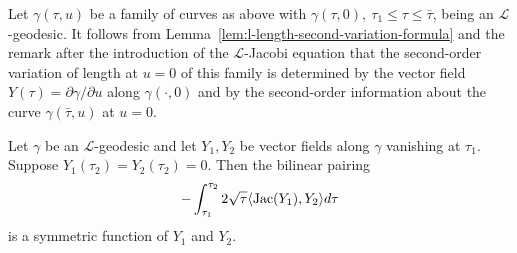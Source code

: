 \begin{remark}\label{rem:second-variation-determined-by-jacobi}
\label{variremark}

Let $\gamma(\tau,u)$ be a family of curves as above with
$\gamma(\tau,0),\ \tau_1\le \tau\le \bar \tau$, being an ${\mathcal
L}$-geodesic. It follows from Lemma~\ref{lem:l-length-second-variation-formula} and the remark
after the introduction of the ${\mathcal L}$-Jacobi equation that
the second-order variation of length at $u=0$ of this family is
determined by the vector field $Y(\tau)=\partial \gamma/\partial u$
along $\gamma(\cdot,0)$ and by the second-order information about
the curve $\gamma(\bar\tau,u)$ at $u=0$.
\end{remark}


\begin{corollary}\label{cor:l-jacobi-bilinear-symmetric}
\label{symmY}

Let $\gamma$ be an ${\mathcal L}$-geodesic and let $Y_1,Y_2$ be vector fields
along $\gamma$ vanishing at $\tau_1$. Suppose $Y_1(\tau_2)=Y_2(\tau_2)=0$.
 Then the
bilinear pairing
$$-\int_{\tau_1}^{\tau_2}2\sqrt{\tau}\langle
\operatorname{Jac}(Y_1),Y_2\rangle d\tau$$ is a symmetric function of $Y_1$
and $Y_2$.
\end{corollary}

